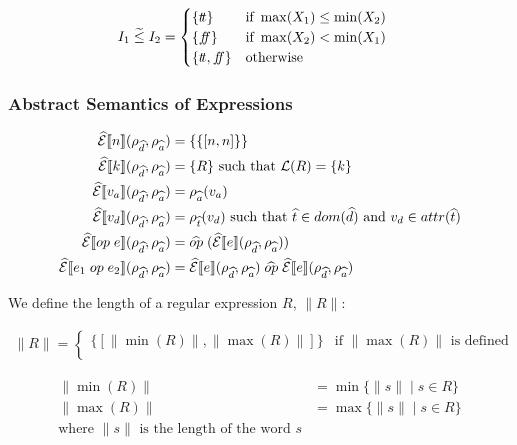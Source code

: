 \begin{align}
    I_1 \;\widetilde{\leq}\; I_2 &= \begin{cases}
        \{t\!t\} & \text{if } \max(X_1) \leq \min(X_2) \\
        \{f\!\!f\} & \text{if } \max(X_2) < \min (X_1) \\
        \{t\!t, f\!\!f\} & \text{otherwise}
    \end{cases}
\end{align}

\subsubsection{Abstract Semantics of Expressions}

\begin{align}
    \widehat{\mathcal{E}}\llbracket n \rrbracket(\rho_{\widehat{d}}, \rho_{\widehat{a}}) &= \{ \{ [n, n] \} \}\\
    \widehat{\mathcal{E}}\llbracket k \rrbracket(\rho_{\widehat{d}}, \rho_{\widehat{a}}) &= \{ R \} \text{ such that }\mathcal{L}(R) = \{ k \} \\
    \widehat{\mathcal{E}}\llbracket v_a \rrbracket(\rho_{\widehat{d}}, \rho_{\widehat{a}}) &=  \rho_{\widehat{a}}(v_a) \\
    \widehat{\mathcal{E}}\llbracket v_d \rrbracket(\rho_{\widehat{d}}, \rho_{\widehat{a}}) &=  \rho_{\widehat{t}}(v_d) \text{ such that } \widehat{t} \in dom(\widehat{d}) \text{ and } v_d \in attr(\widehat{t}) \\
    \widehat{\mathcal{E}}\llbracket op \; e \rrbracket(\rho_{\widehat{d}}, \rho_{\widehat{a}}) &= \widehat{op} \; (\widehat{\mathcal{E}}\llbracket e \rrbracket(\rho_{\widehat{d}}, \rho_{\widehat{a}})) \\
    \widehat{\mathcal{E}}\llbracket e_1 \; op \; e_2 \rrbracket(\rho_{\widehat{d}}, \rho_{\widehat{a}}) &= \widehat{\mathcal{E}}\llbracket e \rrbracket(\rho_{\widehat{d}}, \rho_{\widehat{a}}) \;\widehat{op}\; \widehat{\mathcal{E}}\llbracket e \rrbracket(\rho_{\widehat{d}}, \rho_{\widehat{a}})\\
\end{align}

We define the length of a regular expression $R$, $\|R\|$:

\begin{align}
    \|R\| = \begin{cases}
        \{ [\|\min(R)\|, \|\max(R)\|] \} & \text{if $\|\max(R)\|$ is defined} \\
    \end{cases}
\end{align}

\begin{align}
    \|\min(R)\| &= \min\{ \|s\| \mid s \in R \} \\
    \|\max(R)\| &= \max\{ \|s\| \mid s \in R \} \\
    \text{where $\|s\|$ is the length of the word $s$}
\end{align}

